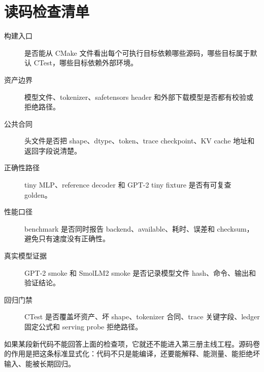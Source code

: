 \chapter*{读码检查清单}

\begin{description}
  \item[构建入口] 是否能从 CMake 文件看出每个可执行目标依赖哪些源码，哪些目标属于默认 CTest，哪些目标依赖外部环境。
  \item[资产边界] 模型文件、tokenizer、safetensors header 和外部下载模型是否都有校验或拒绝路径。
  \item[公共合同] 头文件是否把 shape、dtype、token、trace checkpoint、KV cache 地址和返回字段说清楚。
  \item[正确性路径] tiny MLP、reference decoder 和 GPT-2 tiny fixture 是否有可复查 golden。
  \item[性能口径] benchmark 是否同时报告 backend、available、耗时、误差和 checksum，避免只有速度没有正确性。
  \item[真实模型证据] GPT-2 smoke 和 SmolLM2 smoke 是否记录模型文件 hash、命令、输出和验证结论。
  \item[回归门禁] CTest 是否覆盖坏资产、坏 shape、tokenizer 合同、trace 关键字段、ledger 固定公式和 serving probe 拒绝路径。
\end{description}

如果某段新代码不能回答上面的检查项，它就还不能进入第三册主线工程。源码卷的作用是把这条标准显式化：代码不只是能编译，还要能解释、能测量、能拒绝坏输入、能被长期回归。
